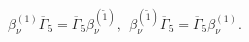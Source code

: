 \begin{equation}
 \beta _\nu
^{(1)}\overline{\Gamma }_5=\overline{\Gamma }_5 \beta _\nu
^{(\widetilde{1})} ,~~\beta _\nu
^{(\widetilde{1})}\overline{\Gamma }_5=\overline{\Gamma }_5 \beta
_\nu ^{(1)} .
   \label{78}
\end{equation}

